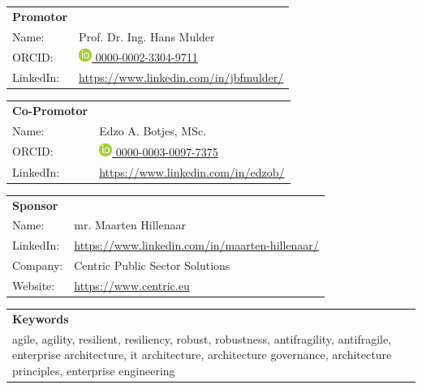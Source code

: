 \begin{minipage}{1\textwidth}
	\begin{tabular}{p{}p{}}
		\textbf{Promotor} & \\
		Name: & Prof. Dr. Ing. Hans Mulder \\
		ORCID: & \href{https://orcid.org/0000-0002-3304-9711/}{\includegraphics[scale=0.45]{images/ORCIDiD_icon} 0000-0002-3304-9711}\\
		LinkedIn: & \url{https://www.linkedin.com/in/jbfmulder/}\\
	\end{tabular}
\end{minipage}

\begin{minipage}{1\textwidth}
	\begin{tabular}{p{}p{}}
		\textbf{Co-Promotor} & \\
		Name: & Edzo A. Botjes, MSc. \\
		ORCID: & \href{https://orcid.org/0000-0003-0097-7375/}{\includegraphics[scale=0.45]{images/ORCIDiD_icon} 0000-0003-0097-7375}\\
		LinkedIn: & \url{https://www.linkedin.com/in/edzob/}\\
	\end{tabular}
\end{minipage}

\begin{minipage}{1\textwidth}
	\begin{tabular}{p{}p{}}
		\textbf{Sponsor} & \\
		Name: & mr. Maarten Hillenaar \\
		LinkedIn:	&	\url{https://www.linkedin.com/in/maarten-hillenaar/}\\
		Company:	&	Centric Public Sector Solutions\\
		Website:	&	\url{https://www.centric.eu}
	\end{tabular}
\end{minipage}

\begin{minipage}{}
	\begin{tabular}{p{1\textwidth}}
		\textbf{Keywords} \\
		agile, agility, resilient, resiliency, robust, robustness, antifragility, antifragile, enterprise architecture, it architecture, architecture governance, architecture principles, enterprise engineering\\%
	\end{tabular}
\end{minipage}